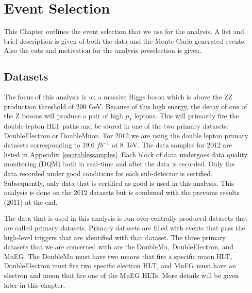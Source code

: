 \chapter{Event Selection}

This Chapter outlines the event selection that we use for the analysis.  A list and brief description is given of both the data and the Monte Carlo generated events. Also the cuts and motivation for the analysis preselection is given.

\section{Datasets}

The focus of this analysis is on a massive Higgs boson which is above the ZZ production threshold of 200 GeV.  Because of this high energy, the decay of one of the Z bosons will produce a pair of high $p_T$ leptons.  This will primarily fire the double-lepton HLT paths and be stored in one of the two primary datasets: DoubleElectron or DoubleMuon.  For 2012 we are using the double lepton primary datasets corresponding to 19.6 $fb^{-1}$ at 8 TeV. The data samples for 2012 are listed in Appendix~\ref{sec:tablessamples}.  Each block of data undergoes data quality monitoring (DQM) both in real-time and after the data is recorded.  Only the data recorded under good conditions for each sub-detector is certified.  Subsequently, only data that is certified as good is used in this analysis. This analysis is done on the 2012 datasets but is combined with the previous results (2011) at the end.

The data that is used in this analysis is run over centrally produced datasets that are called primary datasets.  Primary datasets are filled with events that pass the high-level triggers that are identified with that dataset.  The three primary datasets that we are concerned with are the DoubleMu, DoubleElectron, and MuEG.  The DoubleMu must have two muons that fire a specific muon HLT, DoubleElectron must fire two specific electron HLT, and MuEG must have an electron and muon that fire one of the MuEG HLTs.  More details will be given later in this chapter.



    
